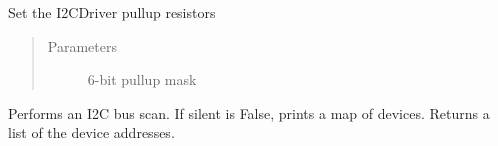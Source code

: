 \begin{fulllineitems}
\begin{fulllineitems}
\begin{quote}
\begin{description}
\end{description}\end{quote}

\end{fulllineitems}


\begin{fulllineitems}
\label{\detokenize{index:i2cdriver.I2CDriver.setpullups}}
Set the I2CDriver pullup resistors
\begin{quote}\begin{description}
\item[{Parameters}] \leavevmode
{} \textendash{} 6-bit pullup mask

\end{description}\end{quote}

\end{fulllineitems}


\begin{fulllineitems}
\label{\detokenize{index:i2cdriver.I2CDriver.scan}}
Performs an I2C bus scan.
If silent is False, prints a map of devices.
Returns a list of the device addresses.


\end{fulllineitems}
\end{fulllineitems}
